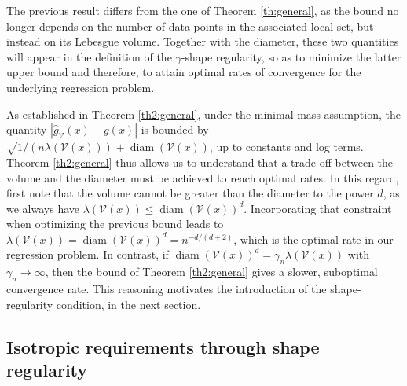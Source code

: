 \documentclass[paper=a4, fontsize=11pt]{scrartcl}
\newcommand{\diam}{\operatorname{diam}}
\begin{document}
The previous result differs from the one of Theorem \ref{th:general}, as the bound no longer depends on the number of data points in the associated local set, but instead on its Lebesgue volume. Together with the diameter, these two quantities will appear in the definition of the $\gamma$-shape regularity, so as to minimize the latter upper bound and therefore, to attain optimal rates of convergence for the underlying regression problem.

 As established in Theorem \ref{th2:general}, under the minimal mass assumption, the quantity $ |\hat g_{\mathcal V}(x) - g (x) |$ is bounded by
 $  \sqrt { 1 / ( n \lambda (\mathcal V (x)) )    }   +   \diam (\mathcal V (x))  $, up to constants and log terms. Theorem \ref{th2:general} thus allows us to understand that a trade-off between the volume and the diameter must be achieved to reach optimal rates.
In this regard, first note that the volume cannot be greater than the diameter to the power $d$, as we always have $ \lambda (\mathcal V(x) )  \leq \diam ( \mathcal V(x) )^d $. Incorporating that constraint when optimizing the previous bound leads to $\lambda (\mathcal V(x) ) = \diam ( \mathcal V(x) )^d = n^{-d/(d+2)}$, which is the optimal rate in our regression problem. In contrast, if $ \diam ( \mathcal V(x) )^d = \gamma_n \lambda (\mathcal V(x) )   $ with $\gamma_n \to \infty$, then the bound of Theorem \ref{th2:general} gives a slower, suboptimal convergence rate. This reasoning motivates the introduction of the shape-regularity condition, in the next section.




\subsection{Isotropic requirements through shape regularity}\label{sec_SR}
\end{document}
